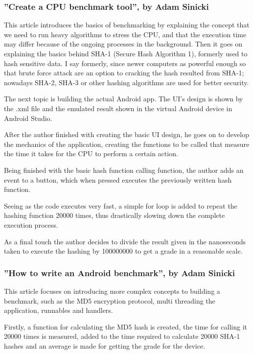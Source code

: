 \documentclass[a4paper,10pt]{report}
\begin{document}
 \subsubsection{''Create a CPU benchmark tool'', by Adam Sinicki}
 This article introduces the basics of benchmarking by explaining the concept that we need to run heavy algorithms to stress the CPU, and that the execution time may differ because of the ongoing processes in the background. Then it goes on explaining the basics behind SHA-1 (Secure Hash Algorithm 1), formerly used to hash sensitive data. I say formerly, since newer computers as powerful enough so that brute force attack are an option to cracking the hash resulted from SHA-1; nowadays SHA-2, SHA-3 or other hashing algorithms are used for better security.

 The next topic is building the actual Android app. The UI's design is shown by the .xml file and the emulated result shown in the virtual Android device in Android Studio.

 After the author finished with creating the basic UI design, he goes on to develop the mechanics of the application, creating the functions to be called that measure the time it takes for the CPU to perform a certain action.
 
 Being finished with the basic hash function calling function, the author adds an event to a button, which when pressed executes the previously written hash function.
 
 Seeing as the code executes very fast, a simple for loop is added to repeat the hashing function 20000 times, thus drastically slowing down the complete execution process. 
 
 As a final touch the author decides to divide the result given in the nanoseconds taken to execute the hashing by 100000000 to get a grade in a reasonable scale.

 \subsubsection{''How to write an Android benchmark'', by Adam Sinicki}
 This article focuses on introducing more complex concepts to building a benchmark, such as the MD5 encryption protocol, multi threading the application, runnables and handlers.
 
 Firstly, a function for calculating the MD5 hash is created, the time for calling it 20000 times is measured, added to the time required to calculate 20000 SHA-1 hashes and an average is made for getting the grade for the device.
 
\end{document}

